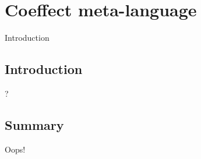 \chapter{Coeffect meta-language} 
\label{ch:metalanguage} 


Introduction


\section{Introduction}
\label{sec:metalanguage-intro}

?

\section{Summary}
Oops!
